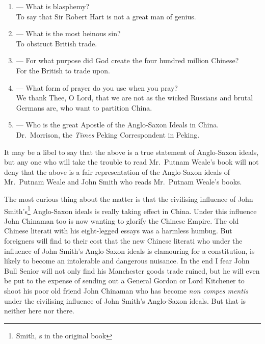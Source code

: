\begin{enumerate}
    \item --- What is blasphemy? \\ To say that Sir Robert Hart is not a great man of genius.\vspace{-0.2cm}
    \item --- What is the most heinous sin? \\ To obstruct British trade.\vspace{-0.2cm}
    \item --- For what purpose did God create the four hundred million Chinese? \\ For the British to trade upon.\vspace{-0.2cm}
    \item --- What form of prayer do you use when you pray? \\ We thank Thee, O Lord, that we are not as the wicked Russians and brutal Germans are, who want to partition China.\vspace{-0.2cm}
    \item --- Who is the great Apostle  of the Anglo-Saxon Ideals in China. \\ Dr.~Morrison,  the \emph{Times} Peking Correspondent in Peking.
\end{enumerate}

It may be a libel to say that the above is a true statement of Anglo-Saxon ideals, but any one who will take the trouble to read Mr.~Putnam Weale's book will not deny that the above is a fair representation of the Anglo-Saxon ideals of Mr.~Putnam Weale and John Smith who reads Mr.~Putnam Weale's books.

The most curious thing about the matter is that the civilising influence of John Smith's\footnote{Smith, s in the original book} Anglo-Saxon ideals is really taking effect in China.
Under this influence John Chinaman too is now wanting to glorify the Chinese Empire.
The old Chinese literati with his eight-legged essays  was a harmless humbug.
But foreigners will find to their cost that the new Chinese literati who under the influence of John Smith's Anglo-Saxon ideals is clamouring for a constitution, is likely to become an intolerable and dangerous nuisance.
In the end I fear John Bull Senior will not only find his Manchester goods trade ruined, but he will even be put to the expense of sending out  a General Gordon or Lord Kitchener  to shoot his poor old friend John Chinaman who has become \emph{non compes mentis}  under the civilising influence of John Smith's Anglo-Saxon ideals.
But that is neither here nor there.

